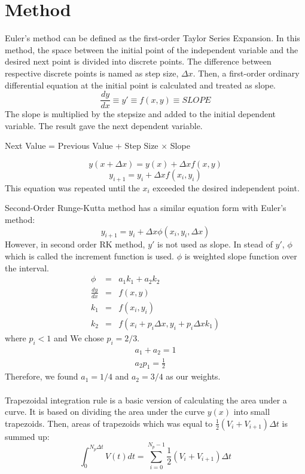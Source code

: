 \documentclass[letterpaper,12pt]{article}
\begin{document}
\section{Method}
Euler's method can be defined as the first-order Taylor Series Expansion. In this method, the space between
the initial point of the independent variable and the desired next point is divided into discrete points. The 
difference between respective discrete points is named as step size, $\Delta x$. Then, a first-order ordinary
differential equation at the initial point is calculated and treated as slope.
\begin{equation}
\frac{dy}{dx} \equiv y \prime \equiv f(x,y) \equiv SLOPE
\end{equation}
The slope is multiplied by the stepsize
and added to the initial dependent variable. The result gave the next dependent variable.

\begin{center}
Next Value = Previous Value + Step Size $\times $ Slope
\end{center}
\begin{equation}
y(x + \Delta x ) = y(x) + \Delta x f(x,y)
\end{equation}
\begin{equation}
y_{i+1} = y_i + \Delta x f(x_i , y_i)
\label{eq:eul}
\end{equation}
This equation was repeated until the $x_i$ exceeded the desired independent point.

Second-Order Runge-Kutta method has a similar equation form with Euler's method:
\begin{equation}
y_{i+1} = y_i + \Delta x \phi (x_i , y_i, \Delta x)
\label{eq:rk2}
\end{equation}
However, in second order RK method, $y\prime $ is not used as slope. In stead of $y\prime $, $\phi$ which is 
called the increment function is used. $\phi$ is weighted slope function over the interval.
\begin{eqnarray}
\phi&=&a_1k_1 + a_2k_2\\
\frac{dy}{dx}&=&f(x,y) \nonumber\\
k_1&=&f(x_i,y_i) \nonumber\\
k_2&=&f(x_i+p_i\Delta x, y_i+p_i\Delta x k_1) \nonumber
\end{eqnarray}
where $p_i<1$  and
We chose $p_i = 2/3 $.
\begin{eqnarray}
a_1+a_2 = 1  \nonumber \\
a_2p_1 = \frac{1}{2} \nonumber 
\end{eqnarray}
Therefore, we found $a_1=1/4$ and $a_2=3/4$ as our weights.
\\\\
Trapezoidal integration rule is a basic version of calculating the area under a curve. It is based on
dividing the area under the curve $y(x)$ into small trapezoids. Then, areas of trapezoids which was equal to 
$\frac {1}{2}(V_i+V_{i+1})\Delta t $ is summed up:
\begin{equation}
\int_{0}^{N_p\Delta t} V(t) dt = \sum_{i=0}^{N_p-1} \frac{1}{2}(V_i+V_{i+1}) \Delta t 
\end{equation}
\end{document}
